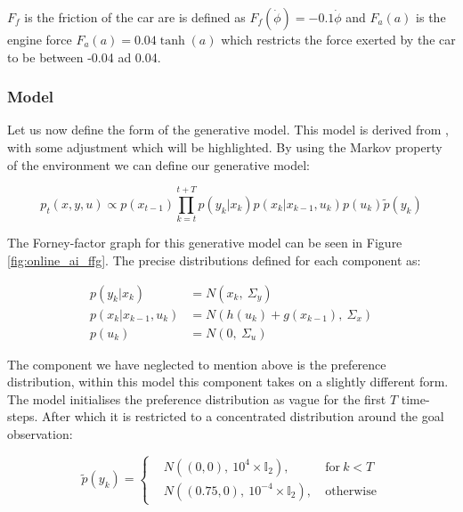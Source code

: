 \documentclass{article}
\begin{document}
$F_f$ is the friction of the car are is defined as $F_f(\dot{\phi}) = -0.1 \dot{\phi}$ and $F_a(a)$ is the engine force $F_a(a) = 0.04 \tanh(a)$ which restricts the force exerted by the car to be between -0.04 ad 0.04.

\subsubsection{Model}

Let us now define the form of the generative model. This model is derived from \citet{van2019simulating}, with some adjustment which will be highlighted. By using the Markov property of the environment we can define our generative model:

\begin{equation}\label{eq:mountain_car_generative_model}
	p_t(x, y, u) \propto p(x_{t-1}) \prod_{k=t}^{t + T} p(y_k | x_k) p(x_k | x_{k-1}, u_k)p(u_k)\tilde{p}(y_k)
\end{equation}

The Forney-factor graph for this generative model can be seen in Figure \ref{fig:online_ai_ffg}. The precise distributions defined for each component as:

\begin{equation}
\begin{aligned}
	p(y_k | x_k) &= N(x_k, \ \Sigma_y ) \\
	p(x_k | x_{k-1}, u_k) &= N(h(u_k) + g(x_{k-1}), \ \Sigma_x) \\
	p(u_k) &= N(0, \ \Sigma_u)
\end{aligned}	
\end{equation}

The component we have neglected to mention above is the preference distribution, within this model this component takes on a slightly different form. The model initialises the preference distribution as vague for the first $T$ time-steps. After which it is restricted to a concentrated distribution around the goal observation:


\begin{equation}
	\tilde{p}(y_k) = \left\{
	\begin{aligned}
		& N\left((0, 0), \ 10^{4} \times \mathbb{I}_2 \right) , \ & \text{for} \ k < T \\
		& N\left((0.75, 0), \ 10^{-4} \times \mathbb{I}_2 \right) , \ & \text{otherwise}
	\end{aligned}
	\right.
\end{equation}
\end{document}
